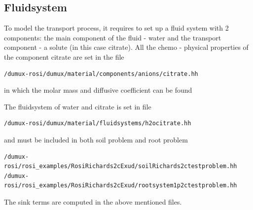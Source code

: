 \subsection*{Fluidsystem}

To model the transport process, it requires to set up a fluid system
with 2 components: the main component of the fluid - water and the
transport component - a solute (in this case citrate). All the chemo - physical properties of the component citrate are set in the file

\begin{lstlisting}
/dumux-rosi/dumux/material/components/anions/citrate.hh
\end{lstlisting}

in which the molar mass and diffusive coefficient can be found








The fluidsystem of water and citrate is set in file

\begin{lstlisting}
/dumux-rosi/dumux/material/fluidsystems/h2ocitrate.hh
\end{lstlisting}

and must be included in both soil problem and root problem

\begin{lstlisting}
/dumux-rosi/rosi_examples/RosiRichards2cExud/soilRichards2ctestproblem.hh
/dumux-rosi/rosi_examples/RosiRichards2cExud/rootsystem1p2ctestproblem.hh
\end{lstlisting}

The sink terms are computed in the above mentioned files.





